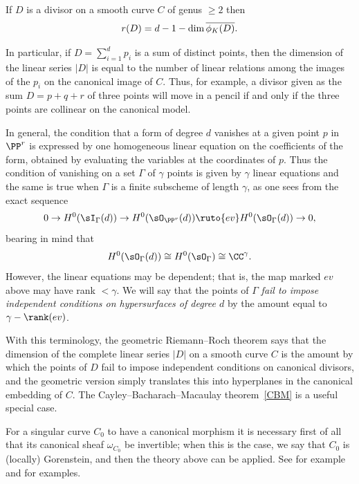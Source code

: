 \begin{corollary}\label{geometric RR}
If $D$ is a divisor on a smooth curve $C$ of genus $\geq 2$ then
$$
r(D) = d - 1 - \dim \overline{ \phi_K(D)}.
\vspace*{-3pt}
$$
\end{corollary}
%
In particular, if $D = \sum_{i=1}^dp_i$ is a sum of distinct points, then
 the dimension of the linear series $|D|$  is equal to the number of linear relations among the images of the $p_i$ on the canonical 
 image of $C$. 
 Thus, for example, a divisor given as the sum $D = p+q+r$ of three
 points will move in a pencil if and only if the three points are
 collinear on the canonical model. 

In general, 
the condition that a form of degree $d$ vanishes at 
a given point $p$ in $\PP^r$ is expressed
by one homogeneous linear
equation on the coefficients of the form, obtained by evaluating the variables at 
 the coordinates of $p$.  Thus the condition of vanishing on a set $\Gamma$ of $\gamma$ points is given by
 $\gamma$ linear equations and the same is true when $\Gamma$ is a finite subscheme
 of length $\gamma$, as one sees from the exact sequence
 $$
 0\to H^0(\sI_\Gamma(d)) \to H^0(\sO_{\PP^r}(d)) \ruto{ev} H^0(\sO_{\Gamma}(d)) \to 0,
 $$
 bearing in mind that 
 $$
 H^0(\sO_{\Gamma}(d)) \cong H^0(\sO_{\Gamma}) \cong \CC^\gamma.
 $$
However, the linear equations may be dependent; that is, the map marked $ev$
above may have rank $<\gamma$. We will say that the points of $\Gamma$
\emph{fail to impose independent conditions on hypersurfaces of degree $d$}
by the amount equal to $\gamma - \rank(ev)$. 

With this terminology, the geometric Riemann--Roch theorem says that 
the dimension of the complete linear series $|D|$ on a smooth curve $C$
is the amount by which the points of $D$ fail to impose independent conditions
on canonical divisors, and the geometric version simply translates this into 
 hyperplanes in the canonical embedding of $C$. 
%
The Cayley--Bacharach--Macaulay
theorem~\ref{CBM} 
is a useful
special case.

\begin{remark}
For a singular curve $C_0$ to have a canonical morphism it is necessary first of all that its canonical sheaf
 $\omega_{C_0}$ be invertible; when this is the case, we say that $C_0$ is (locally) Gorenstein, and then
%
%
the theory above can be applied. See for example \cite{graphcurves} and \cite{ribbons} for examples. 
\end{remark}

